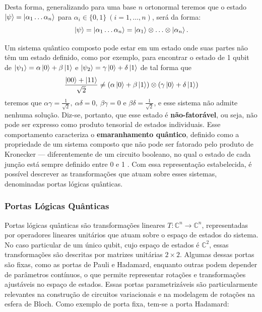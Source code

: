 Desta forma, generalizando para uma base $n$ ortonormal teremos que o estado $\ket{\psi}=\ket{\alpha_1\dots\alpha_n}$ para $\alpha_i\in \{0,1\}\ (i=1,\hdots,n)$, será da forma:
$$
    \ket{\psi}=\ket{\alpha_1\hdots\alpha_n}=\ket{\alpha_1}\otimes\hdots\otimes\ket{\alpha_n}.
$$

Um sistema quântico composto pode estar em um estado onde suas partes não têm um estado definido, como por exemplo, para encontrar o estado de 1 qubit de $\ket{\psi_1}=\alpha\ket{0}+\beta\ket{1}$ e $\ket{\psi_2}=\gamma\ket{0}+\delta\ket{1}$ de tal forma que
\begin{equation}
    \label{eq:estado_bell}
    \dfrac{\ket{00}+\ket{11}}{\sqrt{2}}\neq(\alpha\ket{0}+\beta\ket{1})\otimes(\gamma\ket{0}+\delta\ket{1})
\end{equation}
teremos que $\alpha\gamma = \frac{1}{\sqrt{2}},\ \alpha\delta=0,\ \beta\gamma=0$ e $\beta\delta=\frac{1}{\sqrt{2}}$, e esse sistema não admite nenhuma solução. Diz-se, portanto, que esse estado é \textbf{não-fatorável}, ou seja, não pode ser expresso como produto tensorial de estados individuais. Esse comportamento caracteriza o \textbf{emaranhamento quântico}, definido como a propriedade de um sistema composto que não pode ser fatorado pelo produto de Kronecker — diferentemente de um circuito booleano, no qual o estado de cada junção está sempre definido entre 0 e 1 \cite{Marquezino2019, lipton_quantum_2014}. Com essa representação estabelecida, é possível descrever as transformações que atuam sobre esses sistemas, denominadas portas lógicas quânticas.

\subsubsection{Portas Lógicas Quânticas}
Portas lógicas quânticas são transformações lineares \(T:\mathbb{C}^n \rightarrow \mathbb{C}^n\), representadas por operadores lineares unitários que atuam sobre o espaço de estados do sistema. No caso particular de um único qubit, cujo espaço de estados é \(\mathbb{C}^2\), essas transformações são descritas por matrizes unitárias \(2\times 2\). Algumas dessas portas são fixas, como as portas de Pauli e Hadamard, enquanto outras podem depender de parâmetros contínuos, o que permite representar rotações e transformações ajustáveis no espaço de estados. Essas portas parametrizáveis são particularmente relevantes na construção de circuitos variacionais e na modelagem de rotações na esfera de Bloch. Como exemplo de porta fixa, tem-se a porta Hadamard: 

